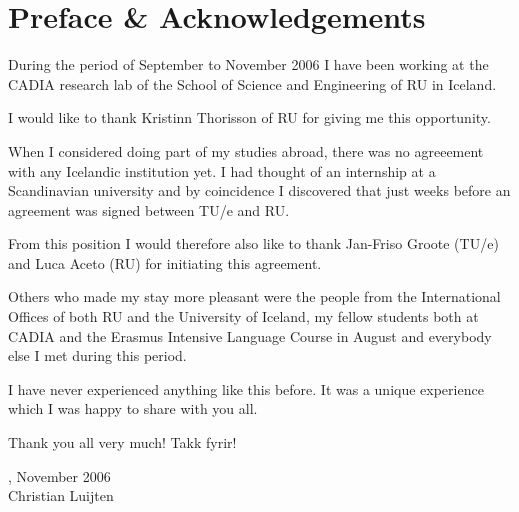 \chapter*{Preface \& Acknowledgements}

During the period of September to November 2006 I have been working at the
\ac{CADIA} research lab of the School of Science and Engineering of \ac{RU} in
Iceland.

I would like to thank Kristinn Thorisson of \ac{RU} for giving me this
opportunity.

When I considered doing part of my studies abroad, there was no agreeement with
any Icelandic institution yet. I had thought of an internship at a Scandinavian
university and by coincidence I discovered that just weeks before an agreement
was signed between \ac{TU/e} and \ac{RU}. 

From this position I would therefore also like to thank Jan-Friso Groote
(\ac{TU/e}) and Luca Aceto (\ac{RU}) for initiating this agreement.

Others who made my stay more pleasant were the people from the International
Offices of both \ac{RU} and the University of Iceland, my fellow students both
at \ac{CADIA} and the Erasmus Intensive Language Course in August and everybody
else I met during this period.

I have never experienced anything like this before. It was a unique experience
which I was happy to share with you all.

\vspace{2em}

Thank you all very much! Takk fyrir!

\Rvk{}, November 2006 \\
Christian Luijten
